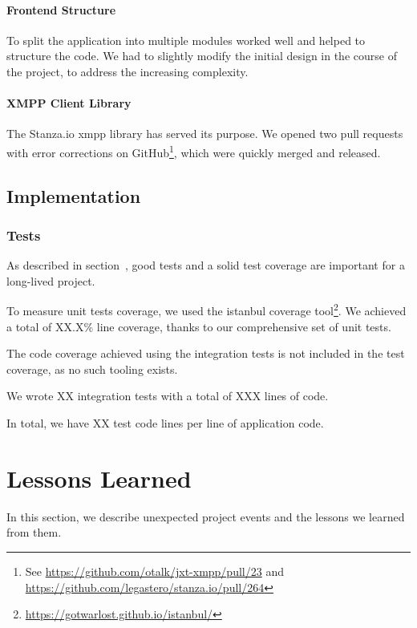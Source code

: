 \paragraph{Frontend Structure}
To split the application into multiple modules worked well and helped to structure the code.
We had to slightly modify the initial design in the course of the project, to address the increasing complexity.

\paragraph{XMPP Client Library}
The Stanza.io \gls{xmpp} library has served its purpose.
We opened two pull requests with error corrections on GitHub\footnote{See \url{https://github.com/otalk/jxt-xmpp/pull/23} and \url{https://github.com/legastero/stanza.io/pull/264}}, which were quickly merged and released.

\subsection{Implementation}

\subsubsection{Tests}
As described in section~, good tests and a solid test coverage are important for a long-lived project.

To measure unit tests coverage, we used the istanbul coverage tool\footnote{\url{https://gotwarlost.github.io/istanbul/}}. We achieved a total of XX.X\% line coverage, thanks to our comprehensive set of unit tests. %

The code coverage achieved using the integration tests is not included in the test coverage, as no such tooling exists.

We wrote XX integration tests with a total of XXX lines of code. %

In total, we have XX test code lines per line of application code.  %


\section{Lessons Learned}

In this section, we describe unexpected project events and the lessons we learned from them.

